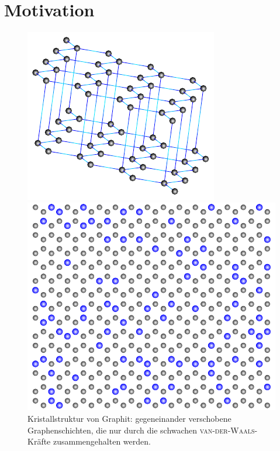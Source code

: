 \documentclass[a4paper, 10pt, twoside, openany]{book} %
\makeatletter
\def \mainmatter {\clearpage \@mainmattertrue \pagenumbering{arabic}}
\makeatother
\begin{document}
\restoregeometry

\mainmatter

\chapter{Motivation}

\begin{figure}[t]
    \begin{minipage}[b]{0.46\textwidth}
        \includegraphics[width=\textwidth]{Abbildungen/Raumstrukturen/Graphit.pdf}
        \caption[Kristallstruktur von Graphit]{Kristallstruktur von Graphit: gegeneinander verschobene Graphenschichten, die nur durch die schwachen \textsc{van-der-Waals}-Kräfte zusammengehalten werden. \cite{Rozplocha}}
        \label{Graphit}
    \end{minipage}
    \hfill
    \begin{minipage}[b]{0.5\textwidth}
        \includegraphics[width=\textwidth]{Abbildungen/random20.pdf}

\end{minipage}
\end{figure}
\end{document}
